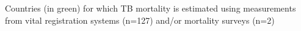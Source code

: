 \label{fig:vr}Countries (in green) for which TB mortality is estimated using measurements from vital registration systems (n=127) and/or mortality surveys (n=2)